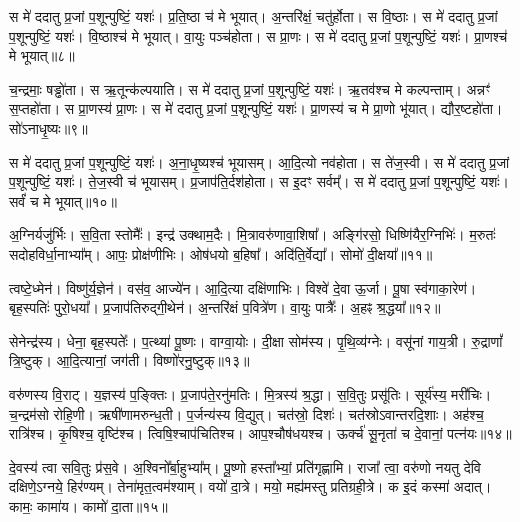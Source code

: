 स मे॑ ददातु प्र॒जां प॒शून्पुष्टिं॒ यशः॑। 
प्र॒ति॒ष्ठा च॑ मे भूयात्। 
अ॒न्तरि॑क्षं॒ चतु॑र्\mbox{}होता। 
स वि॒ष्ठाः। 
स मे॑ ददातु प्र॒जां प॒शून्पुष्टिं॒ यशः॑। 
वि॒ष्ठाश्च॑ मे भूयात्। 
वा॒युः पञ्च॑होता। 
स प्रा॒णः। 
स मे॑ ददातु प्र॒जां प॒शून्पुष्टिं॒ यशः॑। 
प्रा॒णश्च॑ मे भूयात्॥८॥

च॒न्द्रमाः॒ षड्ढो॑ता। 
स ऋ॒तून्क॑ल्पयाति। 
स मे॑ ददातु प्र॒जां प॒शून्पुष्टिं॒ यशः॑। 
ऋ॒तव॑श्च मे कल्पन्ताम्। 
अन्नꣳ॑ स॒प्तहो॑ता। 
स प्रा॒णस्य॑ प्रा॒णः। 
स मे॑ ददातु प्र॒जां प॒शून्पुष्टिं॒ यशः॑। 
प्रा॒णस्य॑ च मे प्रा॒णो भू॑यात्। 
द्यौर॒ष्टहो॑ता। 
सो॑ऽनाधृ॒ष्यः॥९॥

स मे॑ ददातु प्र॒जां प॒शून्पुष्टिं॒ यशः॑। 
अ॒ना॒धृ॒ष्यश्च॑ भूयासम्। 
आ॒दि॒त्यो नव॑होता। 
स ते॑ज॒स्वी। 
स मे॑ ददातु प्र॒जां प॒शून्पुष्टिं॒ यशः॑। 
ते॒ज॒स्वी च॑ भूयासम्। 
प्र॒जाप॑ति॒र्दश॑होता। 
स इ॒दꣳ सर्वम्᳚। 
स मे॑ ददातु प्र॒जां प॒शून्पुष्टिं॒ यशः॑। 
सर्वं॑ च मे भूयात्॥१०॥
\anuvakamend[प्र॒ति॒ष्ठा प्रा॒णश्च॑ मे भूयादनाधृ॒ष्यः सर्वं॑ च मे भूयात्]

अ॒ग्निर्यजु॑र्भिः। 
स॒वि॒ता स्तोमैः᳚। 
इन्द्र॑ उक्थाम॒दैः। 
मि॒त्रावरु॑णा\-वा॒शिषा᳚। 
अङ्गि॑रसो॒ धिष्णि॑यैर॒ग्निभिः॑। 
म॒रुतः॑ सदोहविर्धा॒नाभ्या᳚म्। 
आपः॒ प्रोक्ष॑णीभिः। 
ओष॑धयो ब॒\ar{}हिषा᳚। 
अदि॑ति॒र्वेद्या᳚। 
सोमो॑ दी॒क्षया᳚॥११॥

त्वष्टे॒ध्मेन॑। 
विष्णु॑र्\mbox{}य॒ज्ञेन॑। 
वस॑व॒ आज्ये॑न। 
आ॒दि॒त्या दक्षि॑णाभिः। 
विश्वे॑ दे॒वा ऊ॒र्जा। 
पू॒षा स्व॑गाका॒रेण॑। 
बृह॒स्पतिः॑ पुरो॒धया᳚। 
प्र॒जाप॑तिरुद्गी॒थेन॑। 
अ॒न्तरि॑क्षं प॒वित्रे॑ण। 
वा॒युः पात्रैः᳚। 
अ॒हꣴ श्र॒द्धया᳚॥१२॥
\anuvakamend[दी॒क्षया॒ पात्रै॒रेकं॑ च]

सेनेन्द्र॑स्य। 
धेना॒ बृह॒स्पतेः᳚। 
प॒त्थ्या॑ पू॒ष्णः। 
वाग्वा॒योः। 
दी॒क्षा सोम॑स्य। 
पृ॒थि॒व्य॑ग्नेः। 
वसू॑नां  गाय॒त्री। 
रु॒द्राणां᳚ त्रि॒ष्टुक्। 
आ॒दि॒त्यानां॒ जग॑ती। 
विष्णो॑रनु॒ष्टुक्॥१३॥%

वरु॑णस्य वि॒राट्। 
य॒ज्ञस्य॑ प॒ङ्क्तिः। 
प्र॒जाप॑ते॒रनु॑मतिः। 
मि॒त्रस्य॑ श्र॒द्धा। 
स॒वि॒तुः प्रसू॑तिः। 
सूर्य॑स्य॒ मरी॑चिः। 
च॒न्द्रम॑सो रोहि॒णी। 
ऋषी॑णामरुन्ध॒ती। 
प॒र्जन्य॑स्य वि॒द्युत्। 
चत॑स्रो॒ दिशः॑। 
चत॑स्रोऽवान्तरदि॒शाः। 
अह॑श्च॒ रात्रि॑श्च। 
कृ॒षिश्च॒ वृष्टि॑श्च। 
त्विषि॒श्चाप॑चितिश्च। 
आप॒श्चौष॑धयश्च। 
ऊर्क्च॑ सू॒नृता॑ च दे॒वानां॒ पत्न॑यः॥१४॥%
\anuvakamend[अ॒नु॒ष्टुग्दिशः॒ षट्च॑]

दे॒वस्य॑ त्वा सवि॒तुः प्र॑स॒वे। 
अ॒श्विनो᳚र्बा॒हुभ्या᳚म्। 
पू॒ष्णो हस्ता᳚भ्यां॒ प्रति॑गृह्णामि। 
राजा᳚ त्वा॒ वरु॑णो नयतु देवि दक्षिणे॒ऽग्नये॒ हिर॑ण्यम्। 
तेना॑मृत॒त्वम॑श्याम्। 
वयो॑ दा॒त्रे। 
मयो॒ मह्य॑मस्तु प्रतिग्रही॒त्रे। 
क इ॒दं कस्मा॑ अदात्। 
कामः॒ कामा॑य। 
कामो॑ दा॒ता॥१५॥


